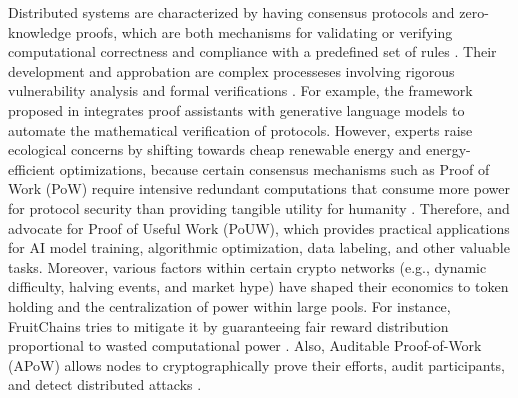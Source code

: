 Distributed systems are characterized by having consensus protocols and zero-knowledge proofs, which are both mechanisms for validating or verifying computational correctness and compliance with a predefined set of rules \cite{lavin2024survey}. Their development and approbation are complex processeses involving rigorous vulnerability analysis and formal verifications \cite{tang2024zeroknowledge}. For example, the framework proposed in \cite{jones2026towards} integrates proof assistants with generative language models to automate the mathematical verification of protocols. However, experts raise ecological concerns by shifting towards cheap renewable energy and energy-efficient optimizations, because certain consensus mechanisms such as Proof of Work (PoW) require intensive redundant computations that consume more power for protocol security than providing tangible utility for humanity \cite{alzoubi2023green,tomatsu2023bitcoin}. Therefore, \cite{hoffmann2022challenges} and \cite{lihu2020proof} advocate for Proof of Useful Work (PoUW), which provides practical applications for AI model training, algorithmic optimization, data labeling, and other valuable tasks. Moreover, various factors within certain crypto networks (e.g., dynamic difficulty, halving events, and market hype) have shaped their economics to token holding and the centralization of power within large pools. For instance, FruitChains tries to mitigate it by guaranteeing fair reward distribution proportional to wasted computational power \cite{pass2017fruitchains}. Also, Auditable Proof-of-Work (APoW) allows nodes to cryptographically prove their efforts, audit participants, and detect distributed attacks \cite{lerner2026apow}.

